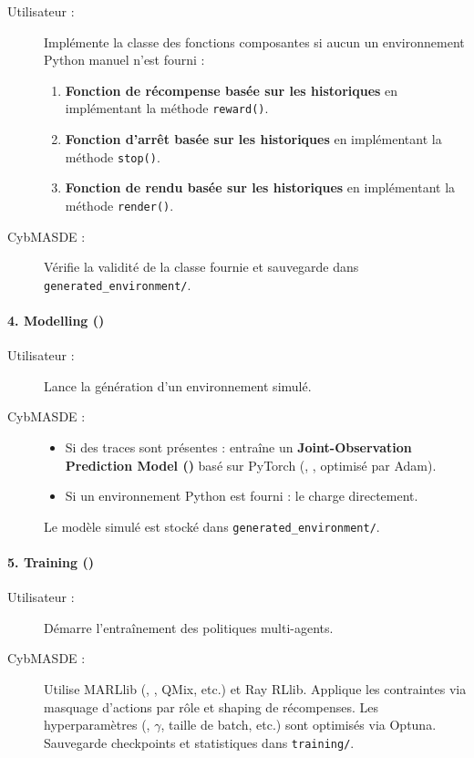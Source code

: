 \begin{description}
  \item[Utilisateur :] Implémente la classe des fonctions composantes si aucun un environnement Python manuel n’est fourni :
    \begin{enumerate}
      \item \textbf{Fonction de récompense basée sur les historiques} en implémentant la méthode \texttt{reward()}.
      \item \textbf{Fonction d'arrêt basée sur les historiques} en implémentant la méthode \texttt{stop()}.
      \item \textbf{Fonction de rendu basée sur les historiques} en implémentant la méthode \texttt{render()}.
    \end{enumerate}
  \item[CybMASDE :] Vérifie la validité de la classe fournie et sauvegarde dans \texttt{generated\_environment/}.
\end{description}

\paragraph{4. Modelling ()}
\begin{description}
  \item[Utilisateur :] Lance la génération d’un environnement simulé.
  \item[CybMASDE :]
    \begin{itemize}
      \item Si des traces sont présentes : entraîne un \textbf{Joint-Observation Prediction Model ()} basé sur PyTorch (, ,  optimisé par Adam).
      \item Si un environnement Python est fourni : le charge directement.
    \end{itemize}
    Le modèle simulé est stocké dans \texttt{generated\_environment/}.
\end{description}

\paragraph{5. Training ()}
\begin{description}
  \item[Utilisateur :] Démarre l’entraînement des politiques multi-agents.
  \item[CybMASDE :] Utilise MARLlib (, , QMix, etc.) et Ray RLlib. Applique les contraintes  via masquage d’actions par rôle et shaping de récompenses. Les hyperparamètres (, $\gamma$, taille de batch, etc.) sont optimisés via Optuna. Sauvegarde checkpoints et statistiques dans \texttt{training/}.
\end{description}

